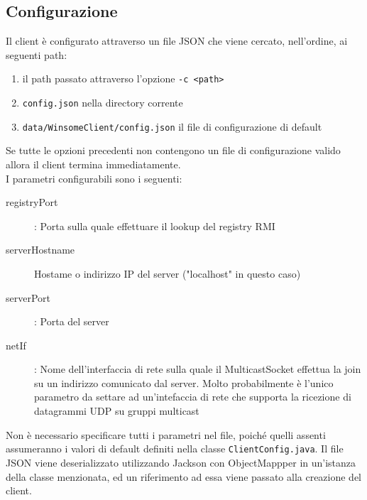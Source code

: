 \subsection{Configurazione}
Il client è configurato attraverso un file JSON che viene cercato, nell'ordine, ai seguenti path:
\begin{enumerate}
	\item il path passato attraverso l'opzione \verb|-c <path>|
	\item \verb|config.json| nella directory corrente
	\item \verb|data/WinsomeClient/config.json| il file di configurazione di default
\end{enumerate}
Se tutte le opzioni precedenti non contengono un file di configurazione valido allora il client termina immediatamente.\\
I parametri configurabili sono i seguenti:

\begin{description}
	\item[registryPort]: Porta sulla quale effettuare il lookup del registry RMI
	\item[serverHostname] Hostame o indirizzo IP del server ("localhost" in questo caso)
	\item[serverPort]: Porta del server
	\item[netIf]: Nome dell'interfaccia di rete sulla quale il MulticastSocket effettua la join su un indirizzo comunicato dal server. Molto probabilmente è l'unico parametro da settare ad un'intefaccia di rete che supporta la ricezione di datagrammi UDP su gruppi multicast
\end{description}

Non è necessario specificare tutti i parametri nel file, poiché quelli assenti assumeranno i valori di default definiti nella classe \verb|ClientConfig.java|. Il file JSON viene deserializzato utilizzando Jackson con ObjectMappper in un'istanza della classe menzionata, ed un riferimento ad essa viene passato alla creazione del client.


